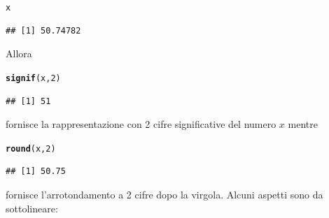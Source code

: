\documentclass[onecolumn,11pt]{book}\usepackage[]{graphicx}\usepackage[]{color}
\makeatletter
\newcommand{\hlnum}[1]{\textcolor[rgb]{0.686,0.059,0.569}{#1}}%
\newcommand{\hlstd}[1]{\textcolor[rgb]{0.345,0.345,0.345}{#1}}%
\newcommand{\hlkwd}[1]{\textcolor[rgb]{0.737,0.353,0.396}{\textbf{#1}}}%
\newenvironment{kframe}{%
 \def\at@end@of@kframe{}%
 \ifinner\ifhmode%
  \def\at@end@of@kframe{\end{minipage}}%
  \begin{minipage}{\columnwidth}%
 \fi\fi%
 \def\FrameCommand##1{\hskip\@totalleftmargin \hskip-\fboxsep
 \colorbox{shadecolor}{##1}\hskip-\fboxsep
     \hskip-\linewidth \hskip-\@totalleftmargin \hskip\columnwidth}%
 \MakeFramed {\advance\hsize-\width
   \@totalleftmargin\z@ \linewidth\hsize
   \@setminipage}}%
 {\par\unskip\endMakeFramed%
 \at@end@of@kframe}
\newenvironment{knitrout}{}{} %
\makeatother
\begin{document}
\begin{knitrout}
\color{fgcolor}\begin{kframe}
\begin{alltt}
\hlstd{x}
\end{alltt}
\begin{verbatim}
## [1] 50.74782
\end{verbatim}
\end{kframe}
\end{knitrout}
Allora
\begin{knitrout}
\color{fgcolor}\begin{kframe}
\begin{alltt}
\hlkwd{signif}\hlstd{(x,}\hlnum{2}\hlstd{)}
\end{alltt}
\begin{verbatim}
## [1] 51
\end{verbatim}
\end{kframe}
\end{knitrout}
fornisce la rappresentazione con 2 cifre significative del numero $x$ mentre
\begin{knitrout}
\color{fgcolor}\begin{kframe}
\begin{alltt}
\hlkwd{round}\hlstd{(x,}\hlnum{2}\hlstd{)}
\end{alltt}
\begin{verbatim}
## [1] 50.75
\end{verbatim}
\end{kframe}
\end{knitrout}
fornisce l'arrotondamento a 2 cifre dopo la virgola. Alcuni aspetti sono da sottolineare:
\end{document}
